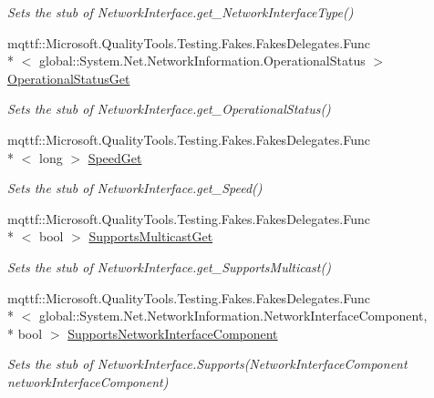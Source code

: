 \begin{DoxyCompactItemize}
\begin{DoxyCompactList}\small\item\em Sets the stub of Network\-Interface.\-get\-\_\-\-Network\-Interface\-Type()\end{DoxyCompactList}\item 
mqttf\-::\-Microsoft.\-Quality\-Tools.\-Testing.\-Fakes.\-Fakes\-Delegates.\-Func\\*
$<$ global\-::\-System.\-Net.\-Network\-Information.\-Operational\-Status $>$ \hyperlink{class_system_1_1_net_1_1_network_information_1_1_fakes_1_1_stub_network_interface_a26ffc186445cb755c6359bb35aed55ac}{Operational\-Status\-Get}
\begin{DoxyCompactList}\small\item\em Sets the stub of Network\-Interface.\-get\-\_\-\-Operational\-Status()\end{DoxyCompactList}\item 
mqttf\-::\-Microsoft.\-Quality\-Tools.\-Testing.\-Fakes.\-Fakes\-Delegates.\-Func\\*
$<$ long $>$ \hyperlink{class_system_1_1_net_1_1_network_information_1_1_fakes_1_1_stub_network_interface_a3a12a79bf9d92761ddf2d7e34ced8976}{Speed\-Get}
\begin{DoxyCompactList}\small\item\em Sets the stub of Network\-Interface.\-get\-\_\-\-Speed()\end{DoxyCompactList}\item 
mqttf\-::\-Microsoft.\-Quality\-Tools.\-Testing.\-Fakes.\-Fakes\-Delegates.\-Func\\*
$<$ bool $>$ \hyperlink{class_system_1_1_net_1_1_network_information_1_1_fakes_1_1_stub_network_interface_ac599cef6fe7c600e6d16f09cd5274e17}{Supports\-Multicast\-Get}
\begin{DoxyCompactList}\small\item\em Sets the stub of Network\-Interface.\-get\-\_\-\-Supports\-Multicast()\end{DoxyCompactList}\item 
mqttf\-::\-Microsoft.\-Quality\-Tools.\-Testing.\-Fakes.\-Fakes\-Delegates.\-Func\\*
$<$ global\-::\-System.\-Net.\-Network\-Information.\-Network\-Interface\-Component, \\*
bool $>$ \hyperlink{class_system_1_1_net_1_1_network_information_1_1_fakes_1_1_stub_network_interface_a3a4b6014c338184527c9789f767efca3}{Supports\-Network\-Interface\-Component}
\begin{DoxyCompactList}\small\item\em Sets the stub of Network\-Interface.\-Supports(\-Network\-Interface\-Component network\-Interface\-Component)\end{DoxyCompactList}\end{DoxyCompactItemize}
